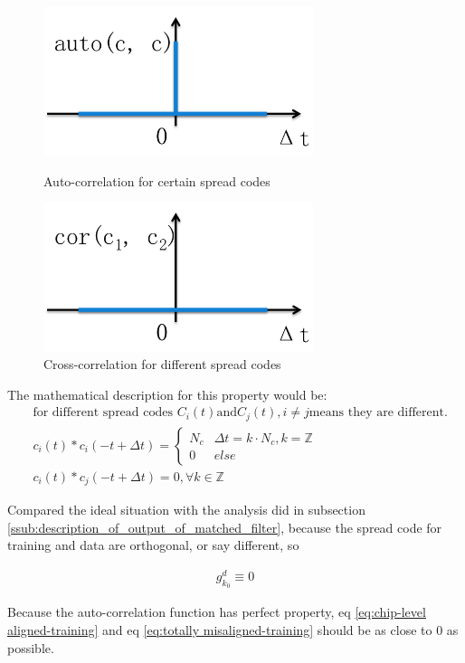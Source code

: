 \documentclass[a4paper]{article}
\begin{document}
\begin{figure}[ht]
	\centering
	\includegraphics[width = 3.1in]{figure/autocorrelation.png}
	\caption{Auto-correlation for certain spread codes}
	\label{fig:auto-correlation}
	\includegraphics[width = 3.1in]{figure/cross-correlation.png}
	\caption{Cross-correlation for different spread codes}
	\label{fig:cross-correlatino}
\end{figure}

The mathematical description for this property would be:
\begin{align}
	&\text{for different spread codes }C_i(t) \text{and} C_j(t), i \neq j \text{means they are different.} \nonumber\\
	&c_i(t) \ast c_i(-t + \Delta t) = 
	\begin{cases}
		N_c &	\Delta t = k \cdot N_c, k = \mathbb{Z}\\
		0 	& 	else
	\end{cases}\\
	&c_i(t) \ast c_j(-t + \Delta t) = 0, \forall k \in \mathbb{Z}
\end{align}

Compared the ideal situation with the analysis did in subsection \ref{ssub:description_of_output_of_matched_filter}, because the spread code for training and data are orthogonal, or say different, so 

\begin{align}
	g^d_{k_0} \equiv 0
\end{align}

Because the auto-correlation function has perfect property, eq \ref{eq:chip-level aligned-training} and eq \ref{eq:totally misaligned-training} should be as close to 0 as possible.








\end{document}
